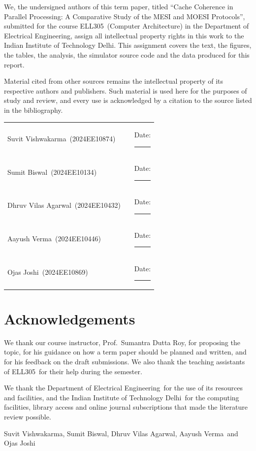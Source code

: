 \documentclass[11pt,a4paper,oneside]{report}
\newcommand{\paperTitle}{Cache Coherence in Parallel Processing:
  A Comparative Study of the MESI and MOESI Protocols}
\newcommand{\memberOne}{Suvit Vishwakarma}
\newcommand{\memberOneEntry}{2024EE10874}
\newcommand{\memberTwo}{Sumit Biswal}
\newcommand{\memberTwoEntry}{2024EE10134}
\newcommand{\memberThree}{Dhruv Vilas Agarwal}
\newcommand{\memberThreeEntry}{2024EE10432}
\newcommand{\memberFour}{Aayush Verma}
\newcommand{\memberFourEntry}{2024EE10446}
\newcommand{\memberFive}{Ojas Joshi}
\newcommand{\memberFiveEntry}{2024EE10869}
\newcommand{\instructorName}{Prof.\ Sumantra Dutta Roy}
\newcommand{\courseCode}{ELL305}
\newcommand{\courseName}{Computer Architecture}
\newcommand{\institute}{Indian Institute of Technology Delhi}
\newcommand{\department}{Department of Electrical Engineering}
\begin{document}
\bigskip
\noindent We, the undersigned authors of this term paper, titled
``\paperTitle'', submitted for the course \courseCode\ (\courseName) in the
\department, assign all intellectual property rights in this work to the
Indian Institute of Technology Delhi. This assignment covers the text, the
figures, the tables, the analysis, the simulator source code and the data
produced for this report.

\bigskip
\noindent Material cited from other sources remains the intellectual property of
its respective authors and publishers. Such material is used here for the
purposes of study and review, and every use is acknowledged by a citation to the
source listed in the bibliography.

\vspace{2cm}
{\renewcommand{\arraystretch}{2.2}
\begin{tabular}{@{}l l l@{}}
\memberOne\ (\memberOneEntry)     & \rule{3.6cm}{0.4pt} & Date: \rule{2.2cm}{0.4pt} \\
\memberTwo\ (\memberTwoEntry)     & \rule{3.6cm}{0.4pt} & Date: \rule{2.2cm}{0.4pt} \\
\memberThree\ (\memberThreeEntry) & \rule{3.6cm}{0.4pt} & Date: \rule{2.2cm}{0.4pt} \\
\memberFour\ (\memberFourEntry)   & \rule{3.6cm}{0.4pt} & Date: \rule{2.2cm}{0.4pt} \\
\memberFive\ (\memberFiveEntry)   & \rule{3.6cm}{0.4pt} & Date: \rule{2.2cm}{0.4pt} \\
\end{tabular}}

\clearpage
\chapter*{Acknowledgements}

We thank our course instructor, \instructorName, for proposing the topic, for
his guidance on how a term paper should be planned and written, and for his
feedback on the draft submissions. We
also thank the teaching assistants of \courseCode\ for their help during the
semester.

We thank the \department\ for the use of its resources and facilities, and the
\institute\ for the computing facilities, library access and online journal
subscriptions that made the literature review possible.

\vspace{1cm}
\noindent\memberOne, \memberTwo, \memberThree, \memberFour\ and \memberFive
\end{document}
